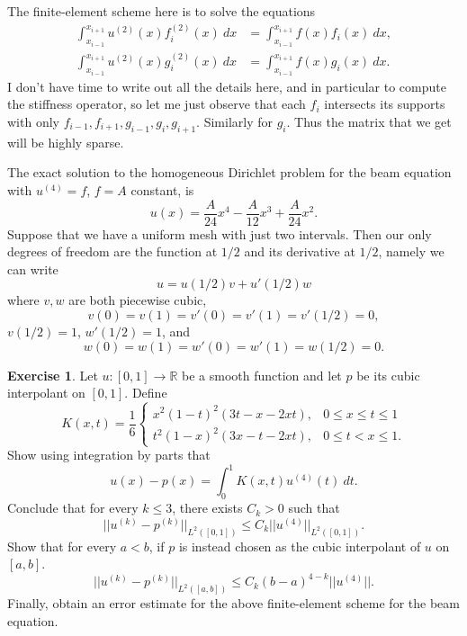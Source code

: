 \documentclass[10pt]{article}
\newcommand{\RR}{\mathbb{R}}
\theoremstyle{definition}
\newtheorem{exer}{Exercise}
\begin{document}
The finite-element scheme here is to solve the equations
\begin{align*}
\int_{x_{i - 1}}^{x_{i + 1}} u^{(2)}(x) f_i^{(2)}(x) ~dx &= \int_{x_{i - 1}}^{x_{i + 1}} f(x) f_i(x) ~dx,\\
\int_{x_{i - 1}}^{x_{i + 1}} u^{(2)}(x) g_i^{(2)}(x) ~dx &= \int_{x_{i - 1}}^{x_{i + 1}} f(x) g_i(x) ~dx.
\end{align*}
I don't have time to write out all the details here, and in particular to compute the stiffness operator, so let me just observe that each $f_i$ intersects its supports with only $f_{i - 1}, f_{i + 1}, g_{i - 1}, g_i, g_{i + 1}$.
Similarly for $g_i$.
Thus the matrix that we get will be highly sparse.

The exact solution to the homogeneous Dirichlet problem for the beam equation with $u^{(4)} = f$, $f = A$ constant, is
$$u(x) = \frac{A}{24}x^4 - \frac{A}{12}x^3 + \frac{A}{24}x^2.$$
Suppose that we have a uniform mesh with just two intervals. Then our only degrees of freedom are the function at $1/2$ and its derivative at $1/2$, namely we can write
$$u = u(1/2)v + u'(1/2)w$$
where $v,w$ are both piecewise cubic,
$$v(0) = v(1) = v'(0) = v'(1) = v'(1/2) = 0,$$
$v(1/2) = 1$, $w'(1/2) = 1$, and
$$w(0) = w(1) = w'(0) = w'(1) = w(1/2) = 0.$$




\begin{exer}
Let $u: [0, 1] \to \RR$ be a smooth function and let $p$ be its cubic interpolant on $[0, 1]$.
Define
$$K(x, t) = \frac{1}{6} \begin{cases} x^2 (1 - t)^2 (3t - x - 2xt), & 0 \leq x \leq t \leq 1 \\
t^2(1 - x)^2(3x - t - 2xt), & 0 \leq t < x \leq 1.
\end{cases}$$
Show using integration by parts that
$$u(x) - p(x) = \int_0^1 K(x, t) u^{(4)}(t) ~dt.$$
Conclude that for every $k \leq 3$, there exists $C_k > 0$ such that
$$||u^{(k)} - p^{(k)}||_{L^2([0, 1])} \leq C_k ||u^{(4)}||_{L^2([0, 1])}.$$
Show that for every $a < b$, if $p$ is instead chosen as the cubic interpolant of $u$ on $[a, b]$.
$$||u^{(k)} - p^{(k)}||_{L^2([a, b])} \leq C_k (b - a)^{4 - k} ||u^{(4)}||.$$
Finally, obtain an error estimate for the above finite-element scheme for the beam equation.
\end{exer}
\end{document}
